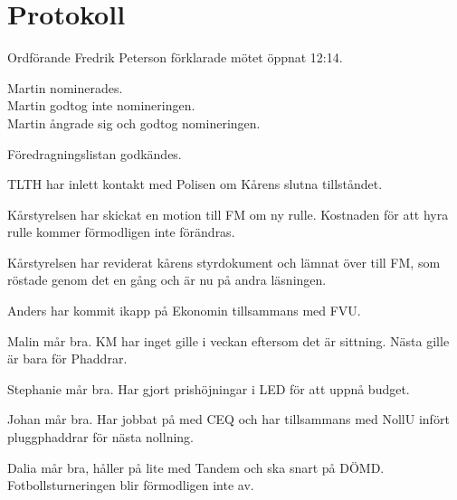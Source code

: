 \documentclass[10pt]{article}
\def\mo{Fredrik Peterson}
\begin{document}
\section*{Protokoll}
\begin{paragrafer}
Ordförande {\mo} förklarade mötet öppnat 12:14.

\valavmo

\valavms

\tosg

\ingaadj

Martin nominerades.\\
Martin godtog inte nomineringen.\\
Martin ångrade sig och godtog nomineringen.

\valavj

Föredragningslistan godkändes.

\begin{fyllnadsval} %
\end{fyllnadsval}


\begin{paragrafer}
TLTH har inlett kontakt med Polisen om Kårens slutna tillståndet.

Kårstyrelsen har skickat en motion till FM om ny rulle. Kostnaden för att hyra rulle kommer förmodligen inte förändras.

Kårstyrelsen har reviderat kårens styrdokument och lämnat över till FM, som röstade genom det en gång och är nu på andra läsningen.

Anders har kommit ikapp på Ekonomin tillsammans med FVU.

Malin mår bra. KM har inget gille i veckan eftersom det är sittning. Nästa gille är bara för Phaddrar.

Stephanie mår bra. Har gjort prishöjningar i LED för att uppnå budget.

Johan mår bra. Har jobbat på med CEQ och har tillsammans med NollU infört pluggphaddrar för nästa nollning.

Dalia mår bra, håller på lite med Tandem och ska snart på DÖMD. Fotbollsturneringen blir förmodligen inte av.


\end{paragrafer}
\end{paragrafer}
\end{document}

